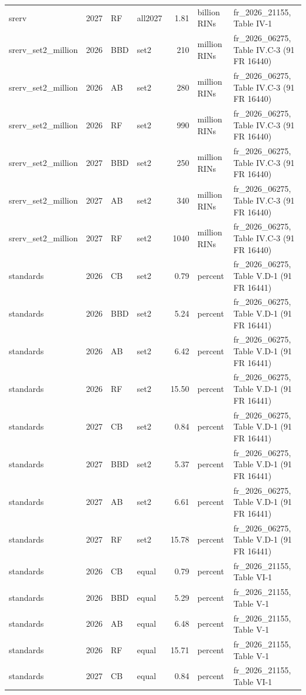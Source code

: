 \begin{longtable}{p{2.3cm}p{0.7cm}p{1.0cm}p{2.6cm}rp{1.7cm}p{4.6cm}}
srerv & 2027 & RF & all2027 & 1.81 & billion RINs & fr\_2026\_21155, Table IV-1 \\
srerv\_set2\_million & 2026 & BBD & set2 & 210 & million RINs & fr\_2026\_06275, Table IV.C-3 (91 FR 16440) \\
srerv\_set2\_million & 2026 & AB & set2 & 280 & million RINs & fr\_2026\_06275, Table IV.C-3 (91 FR 16440) \\
srerv\_set2\_million & 2026 & RF & set2 & 990 & million RINs & fr\_2026\_06275, Table IV.C-3 (91 FR 16440) \\
srerv\_set2\_million & 2027 & BBD & set2 & 250 & million RINs & fr\_2026\_06275, Table IV.C-3 (91 FR 16440) \\
srerv\_set2\_million & 2027 & AB & set2 & 340 & million RINs & fr\_2026\_06275, Table IV.C-3 (91 FR 16440) \\
srerv\_set2\_million & 2027 & RF & set2 & 1040 & million RINs & fr\_2026\_06275, Table IV.C-3 (91 FR 16440) \\
standards & 2026 & CB & set2 & 0.79 & percent & fr\_2026\_06275, Table V.D-1 (91 FR 16441) \\
standards & 2026 & BBD & set2 & 5.24 & percent & fr\_2026\_06275, Table V.D-1 (91 FR 16441) \\
standards & 2026 & AB & set2 & 6.42 & percent & fr\_2026\_06275, Table V.D-1 (91 FR 16441) \\
standards & 2026 & RF & set2 & 15.50 & percent & fr\_2026\_06275, Table V.D-1 (91 FR 16441) \\
standards & 2027 & CB & set2 & 0.84 & percent & fr\_2026\_06275, Table V.D-1 (91 FR 16441) \\
standards & 2027 & BBD & set2 & 5.37 & percent & fr\_2026\_06275, Table V.D-1 (91 FR 16441) \\
standards & 2027 & AB & set2 & 6.61 & percent & fr\_2026\_06275, Table V.D-1 (91 FR 16441) \\
standards & 2027 & RF & set2 & 15.78 & percent & fr\_2026\_06275, Table V.D-1 (91 FR 16441) \\
standards & 2026 & CB & equal & 0.79 & percent & fr\_2026\_21155, Table VI-1 \\
standards & 2026 & BBD & equal & 5.29 & percent & fr\_2026\_21155, Table V-1 \\
standards & 2026 & AB & equal & 6.48 & percent & fr\_2026\_21155, Table V-1 \\
standards & 2026 & RF & equal & 15.71 & percent & fr\_2026\_21155, Table V-1 \\
standards & 2027 & CB & equal & 0.84 & percent & fr\_2026\_21155, Table VI-1 \\

\end{longtable}
